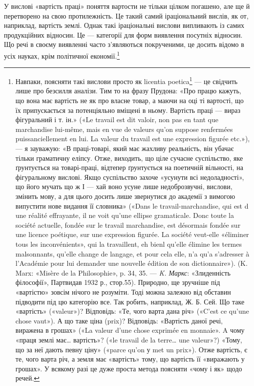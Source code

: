 У вислові «вартість праці» поняття вартости не тільки цілком
погашено, але ще й перетворено на свою протилежність. Це такий
самий іраціональний вислів, як от, наприклад, вартість землі.
Однак такі іраціональні вислови випливають із самих продукційних
відносин. Це — категорії для форм виявлення посутніх
відносин. Що речі в своєму виявленні часто з’являються
покрученими, це досить відомо в усіх науках, крім політичної
економії.\footnote{
Навпаки, поясняти такі вислови просто як licentia poetica\footnote*{
— поетичні вільності. \emph{Ред.}
} — це свідчить лише про безсилля аналізи. Тим то на фразу Прудона: «Про
працю кажуть, що вона має вартість не як про власне товар, а маючи
на оці ті вартості, що їх припускається за потенціяльно вміщені в ньому.
Вартість праці — вираз фігуральний і т. ін.» («Le travail est dit valoir,
non pas en tant que marchandise lui-même, mais en vue de valeurs qu’on
suppose renfermées puissanciellement en lui. La valeur du travail est une
expression figurée etc.»), — я зауважую: «В праці-товарі, який має
жахливу реальність, він убачає тільки граматичну еліпсу. Отже,
виходить, що ціле сучасне суспільство, яке ґрунтується на товарі-праці,
відтепер ґрунтується на поетичній вільності, на фігуральному вислові.
Якщо суспільство захоче «усунути всі недоладності», що його мучать
що ж І — хай воно усуне лише недоброзвучні, вислови, змінить мову, а для
цього досить лише звернутися до академії з вимогою випустити нове
видання її словника» («Dans le travail-marchandise, qui est d une réalité
effrayante, il ne voit qu’une ellipse gramaticale. Donc toute la société actuelle,
fondée sur le travail marchandise, est désormais fondée sur une licence
poétique, sur une expression figurée. La société veut-elle «éliminer tous
les inconvénients», qui la travaillent, eh bienl qu’elle élimine les termes
malsonnants, qu’elle change de langage, et pour cela elle, n’a qu’a s’adresser
à l’Académie pour lui demander une nouvelle édition de son dictionnaire»).
(K. Marx: «Misère de la Philosophie», p. 34, 35. — \emph{K. Маркс}: «Злиденність
філософії», Партвидав 1932 р., стор.55). Природно, ще зручніше під «вартістю»
зовсім нічого не розуміти. Тоді можна залежно від обставин підводити
під цю категорію все. Так робить, наприклад, Ж. Б. Сей. Що
таке «вартість» («valeur»)? Відповідь: «Те, чого варта дана річ» («C’est
ce qu’une chose vaut»). А що таке ціна (prix)? Відповідь: «Вартість даної
речі, виражена в грошах» («La valeur d’une chose exprimée en monnaie».
A чому «праця землі має\dots{} вартість»? («le travail de la terre\dots{} une
valeur»?) «Тому, що за неї дають певну ціну» («parce qu’on у met un
prix»). Отже вартість, є те, чого варта річ, а земля має «вартість» тому,
що вартість її «виражають у грошах». У всякому разі це дуже проста
метода поясняти «чому і як» щодо речей.
}

